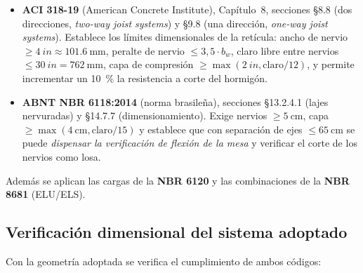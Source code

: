 \begin{itemize}
  \item \textbf{ACI 318-19} (American Concrete Institute), Capítulo~8,
        secciones \S8.8 (dos direcciones, \emph{two-way joist systems}) y
        \S9.8 (una dirección, \emph{one-way joist systems}). Establece
        los límites dimensionales de la retícula:
        ancho de nervio $\geq \SI{4}{in} \approx \SI{101,6}{\milli\meter}$,
        peralte de nervio $\leq 3{,}5 \cdot b_w$, claro libre entre
        nervios $\leq \SI{30}{in} = \SI{762}{\milli\meter}$, capa de
        compresión $\geq \max(\SI{2}{in}, \text{claro}/12)$, y permite
        incrementar un \SI{10}{\percent} la resistencia a corte del
        hormigón.
  \item \textbf{ABNT NBR 6118:2014} (norma brasileña), secciones
        \S13.2.4.1 (lajes nervuradas) y \S14.7.7 (dimensionamiento).
        Exige nervios $\geq \SI{5}{\centi\meter}$, capa
        $\geq \max(\SI{4}{\centi\meter}, \text{claro}/15)$ y establece
        que con separación de ejes $\leq \SI{65}{\centi\meter}$ se puede
        \emph{dispensar la verificación de flexión de la mesa} y
        verificar el corte de los nervios como losa.
\end{itemize}

Además se aplican las cargas de la \textbf{NBR 6120} y las
combinaciones de la \textbf{NBR 8681} (ELU/ELS).

\subsection{Verificación dimensional del sistema adoptado}
\label{sec:verifdim}

Con la geometría adoptada se verifica el cumplimiento de ambos códigos:

